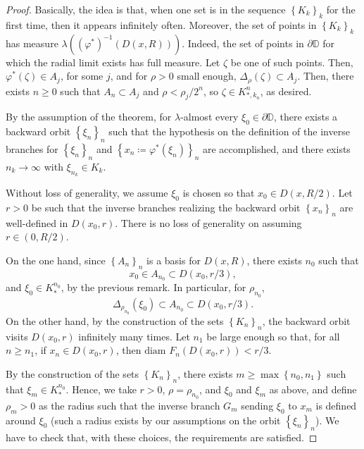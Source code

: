 \documentclass[10pt,a4paper]{amsart}
\begin{document}
\begin{proof}
 Basically, the idea is that, when one set is in the sequence $ \left\lbrace K_k\right\rbrace _k $ for the first time, then it appears infinitely often. Moreover, the set of points in $ \left\lbrace K_k\right\rbrace _k $ has  measure $ \lambda ((\varphi^*)^{-1}(D(x,R))) $. Indeed, the set of points in $ \partial\mathbb{D} $ for which the radial limit exists has full measure. Let $ \zeta $ be one of such points. Then, $ \varphi^*(\zeta) \in A_j$, for some $ j $, and for $ \rho>0 $ small enough, $ \Delta_\rho (\zeta)\subset A_j $. Then, there exists $ n\geq 0 $ such that $ A_n\subset A_j $ and $ \rho<\rho_j/2^n $, so $ \zeta \in K^n_{*, k_n}$, as desired.

By the assumption of the theorem, for $ \lambda $-almost every $ \xi_0\in\partial\mathbb{D} $, 
there exists a backward orbit $ \left\lbrace \xi_n\right\rbrace _n $ such that  the hypothesis on the definition of the inverse branches for $ \left\lbrace \xi_n\right\rbrace _n $ and $ \left\lbrace x_n\coloneqq \varphi^*(\xi_n)\right\rbrace _n $ are accomplished, and there exists $ n_k\to \infty  $ with $ \xi_{n_k}\in K_k $. 

Without loss of generality, we assume $ \xi_0 $ is chosen so that $ x_0\in D(x, R/2) $. Let $ r>0 $ be such that the inverse branches realizing the backward orbit $ \left\lbrace x_n\right\rbrace _n $ are well-defined in $ D(x_0,r) $. There is no loss of generality on assuming $ r\in (0, R/2) $. 

On the one hand, since $ \left\lbrace A_n \right\rbrace _n$ is a basis for $ D(x,R) $, there exists $ n_0 $ such that $$ x_0\in A_{n_0}\subset D(x_0, r/3) , $$ and  $ \xi_0 \in K^{n_0}_*$,  by the previous remark. In particular, for $ \rho_{n_0} $,  
\[\Delta_{\rho_{n_0}}(\xi_0)\subset A_{n_0}\subset D(x_0, r/3).\]
On the other hand, 
by the construction of the sets $ \left\lbrace K_n\right\rbrace _n  $, the backward orbit visits $ D(x_0,r) $ infinitely many times. Let $ n_1 $ be large enough so that, for all $ n\geq n_1 $, if $ x_n\in D(x_0, r) $, then $ \textrm{diam }F_n(D(x_0, r))<r/3  $. 

 By the construction of the sets $ \left\lbrace K_n\right\rbrace _n  $, there exists $ m\geq \max \left\lbrace n_0,  n_1\right\rbrace  $ such that $ \xi_m \in K^{n_0}_*$. Hence, we  take $ r>0 $, $ \rho=\rho_{n_0} $, and $ \xi_0 $ and $ \xi_m $ as above, and define $ \rho_m>0 $ as the radius such that the inverse branch $ G_m $ sending $ \xi_0 $ to $ x_m $ is defined around $ \xi_0 $ (such a radius exists by our assumptions on the orbit $ \left\lbrace \xi_n\right\rbrace _n $). We have to check that, with these choices, the requirements are satisfied. 
 


\end{proof}
\end{document}
